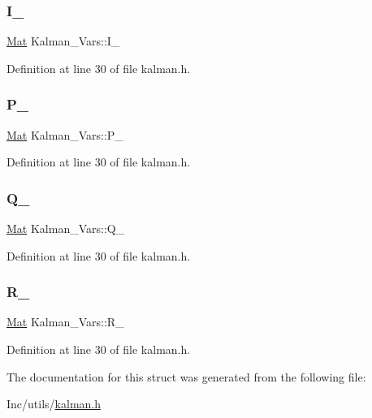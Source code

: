 \subsubsection{\texorpdfstring{I\_}{I\_}}
{\footnotesize\ttfamily \mbox{\hyperlink{class_mat}{Mat}} Kalman\+\_\+\+Vars\+::\+I\+\_\+\hspace{0.3cm}{\ttfamily [private]}}



Definition at line 30 of file kalman.\+h.

\mbox{\label{struct_kalman___vars_a8e744f7c2e3ef0a02bc91b8bf00f2ecb}} 
\subsubsection{\texorpdfstring{P\_}{P\_}}
{\footnotesize\ttfamily \mbox{\hyperlink{class_mat}{Mat}} Kalman\+\_\+\+Vars\+::\+P\+\_\+\hspace{0.3cm}{\ttfamily [private]}}



Definition at line 30 of file kalman.\+h.

\mbox{\label{struct_kalman___vars_ae4a9e7062e833d0660efc4a46c837231}} 
\subsubsection{\texorpdfstring{Q\_}{Q\_}}
{\footnotesize\ttfamily \mbox{\hyperlink{class_mat}{Mat}} Kalman\+\_\+\+Vars\+::\+Q\+\_\+\hspace{0.3cm}{\ttfamily [private]}}



Definition at line 30 of file kalman.\+h.

\mbox{\label{struct_kalman___vars_ab9591fff75edb672a2f7e3b856581dbe}} 
\subsubsection{\texorpdfstring{R\_}{R\_}}
{\footnotesize\ttfamily \mbox{\hyperlink{class_mat}{Mat}} Kalman\+\_\+\+Vars\+::\+R\+\_\+\hspace{0.3cm}{\ttfamily [private]}}



Definition at line 30 of file kalman.\+h.



The documentation for this struct was generated from the following file\+:\begin{DoxyCompactItemize}
\item 
Inc/utils/\mbox{\hyperlink{kalman_8h}{kalman.\+h}}\end{DoxyCompactItemize}
